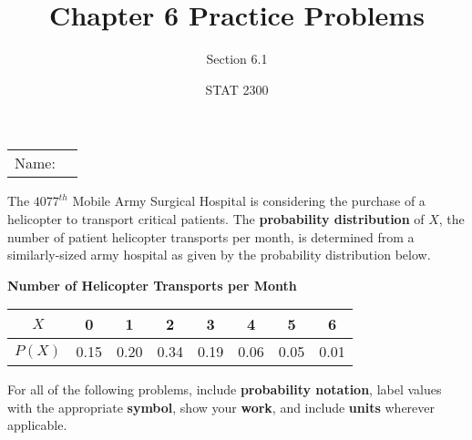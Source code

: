 \documentclass[noanswers]{exam}
\title{Chapter 6 Practice Problems}
\author{Section 6.1}
\date{STAT 2300}
\begin{document}
\noindent\begin{tabular}{@{}p{.3in}p{3in}@{}}
Name: & \hrulefill
\end{tabular}

\vspace{4mm}

\noindent The $4077^{th}$ Mobile Army Surgical Hospital is considering the purchase of a helicopter to transport critical patients. The \textbf{probability distribution} of $X$, the number of patient helicopter transports per month, is determined from a similarly-sized army hospital as given by the probability distribution below.

\vspace{3mm}

\begin{center}
    \textbf{Number of Helicopter Transports per Month}
    
    \vspace{1mm}
    
    \begin{tabular}{| c | c | c | c | c | c | c | c |}
        \hline
        $X$ & 0 & 1 & 2 & 3 & 4 & 5 & 6 \\
         \hline
        $P(X)$ & 0.15 & 0.20 & 0.34 & 0.19 & 0.06 & 0.05 & 0.01 \\
         \hline
    \end{tabular}
	\end{center}
\vspace{3mm}

\noindent For all of the following problems, include \textbf{probability notation}, label values with the appropriate \textbf{symbol}, show your \textbf{work}, and include \textbf{units} wherever applicable.

\vspace{3mm}
\end{document}
